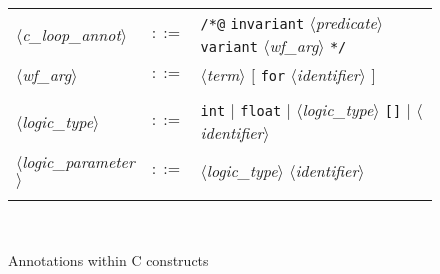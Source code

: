 \documentclass[a4paper,12pt]{report}
\newcommand{\te}[1]{\texttt{#1}}
\newcommand{\nt}[1]{$\langle$\textsl{#1}$\rangle$}
\begin{document}
\begin{figure}[htbp]
\begin{center}
\begin{tabular}{lrl}
  \nt{c\_loop\_annot}
    & $::=$ & \te{/*@} \te{invariant} \nt{predicate} 
              \te{variant} \nt{wf\_arg} \te{*/}  \\
  \nt{wf\_arg} 
    & $::=$ & \nt{term} $[$ \te{for} \nt{identifier} $]$ \\

  \\[0.1em]
  
  \nt{logic\_type}
    & $::=$ & \te{int} $|$ \te{float} $|$ \nt{logic\_type} \te{[]} 
            $|$ \nt{identifier} \\
  \nt{logic\_parameter}
    & $::=$ & \nt{logic\_type} \nt{identifier} \\

  \\[0.1em]
\end{tabular}\\
\hrulefill
\caption{Annotations within C constructs}
\label{fig:cfiles}
\end{center}           
\end{figure}
\end{document}
